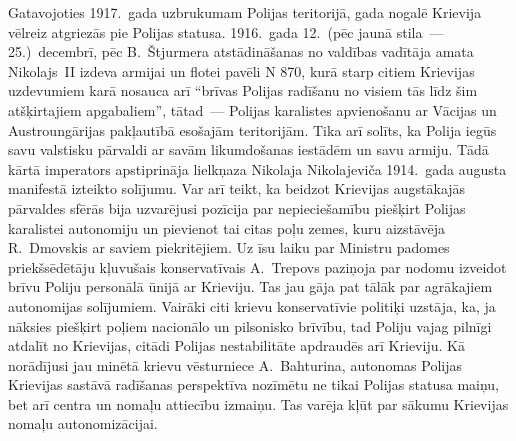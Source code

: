 \documentclass[twoside,a5paper,12pt,fleqn,openany]{extbook}
\begin{document}
Gatavojoties 1917.~gada uzbrukumam Polijas teritorijā, gada nogalē Krievija vēlreiz atgriezās pie Polijas statusa. 1916.~gada 12.~(pēc jaunā stila~--- 25.)~decembrī, pēc B.~Štjurmera atstādināšanas no valdības vadītāja amata Nikolajs~II izdeva armijai un flotei pavēli N 870, kurā starp citiem Krievijas uzdevumiem karā nosauca arī ``brīvas Polijas radīšanu no visiem tās līdz šim atšķirtajiem apgabaliem'', tātad~--- Polijas karalistes apvienošanu ar Vācijas un Austroungārijas pakļautībā esošajām teritorijām. Tika arī solīts, ka Polija iegūs savu valstisku pārvaldi ar savām likumdošanas iestādēm un savu armiju. Tādā kārtā imperators apstiprināja lielkņaza Nikolaja Nikolajeviča 1914.~gada augusta manifestā izteikto solījumu. Var arī teikt, ka beidzot Krievijas augstākajās pārvaldes sfērās bija uzvarējusi pozīcija par nepieciešamību piešķirt Polijas karalistei autonomiju un pievienot tai citas poļu zemes, kuru aizstāvēja R.~Dmovskis ar saviem piekritējiem. Uz īsu laiku par Ministru padomes priekšsēdētāju kļuvušais konservatīvais A.~Trepovs paziņoja par nodomu izveidot brīvu Poliju personālā ūnijā ar Krieviju. Tas jau gāja pat tālāk par agrākajiem autonomijas solījumiem. Vairāki citi krievu konservatīvie politiķi uzstāja, ka, ja nāksies piešķirt poļiem nacionālo un pilsonisko brīvību, tad Poliju vajag pilnīgi atdalīt no Krievijas, citādi Polijas nestabilitāte apdraudēs arī Krieviju. Kā norādījusi jau minētā krievu vēsturniece A.~Bahturina, autonomas Polijas Krievijas sastāvā radīšanas perspektīva nozīmētu ne tikai Polijas statusa maiņu, bet arī centra un nomaļu attiecību izmaiņu. Tas varēja kļūt par sākumu Krievijas nomaļu autonomizācijai.
\end{document}
